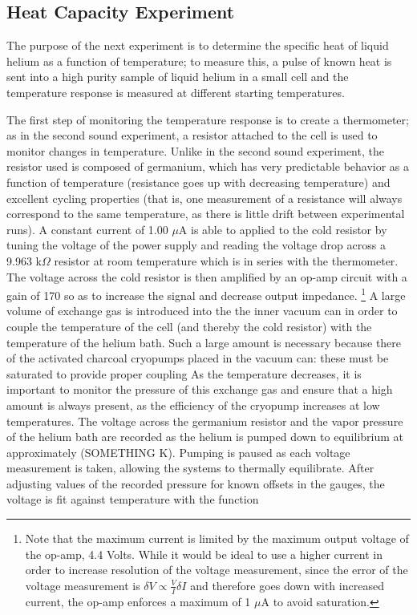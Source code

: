 \subsection{Heat Capacity Experiment}\label{heatcapacityexperiment}

The purpose of the next experiment is to determine the specific heat of liquid helium as a function of temperature; to measure this, a pulse of known heat is sent into a high purity sample of liquid helium in a small cell and the temperature response is measured at different starting temperatures.

The first step of monitoring the temperature response is to create a thermometer; as in the second sound experiment, a resistor attached to the cell is used to monitor changes in temperature. Unlike in the second sound experiment, the resistor used is composed of germanium, which has very predictable behavior as a function of temperature (resistance goes up with decreasing temperature) and excellent cycling properties (that is, one measurement of a resistance will always correspond to the same temperature, as there is little drift between experimental runs). A constant current of 1.00 $\mu$A is able to applied to the cold resistor by tuning the voltage of the power supply and reading the voltage drop across a 9.963 k$\Omega$ resistor at room temperature which is in series with the thermometer. The voltage across the cold resistor is then amplified by an op-amp circuit with a gain of 170 so as to increase the signal and decrease output impedance. \footnote{Note that the maximum current is limited by the maximum output voltage of the op-amp, 4.4 Volts. While it would be ideal to use a higher current in order to increase resolution of the voltage measurement, since the error of the voltage measurement is $\delta V \propto \frac{V}{I} \delta I$ and therefore goes down with increased current, the op-amp enforces a maximum of 1 $\mu$A to avoid saturation.} A large volume of exchange gas is introduced into the the inner vacuum can in order to couple the temperature of the cell (and thereby the cold resistor) with the temperature of the helium bath. Such a large amount is necessary because there of the activated charcoal cryopumps placed in the vacuum can: these must be saturated to provide proper coupling As the temperature decreases, it is important to monitor the pressure of this exchange gas and ensure that a high amount is always present, as the efficiency of the cryopump increases at low temperatures. The voltage across the germanium resistor and the vapor pressure of the helium bath are recorded as the helium is pumped down to equilibrium at approximately (SOMETHING K). Pumping is paused as each voltage measurement is taken, allowing the systems to thermally equilibrate. After adjusting values of the recorded pressure for known offsets in the gauges, the voltage is fit against temperature with the function

